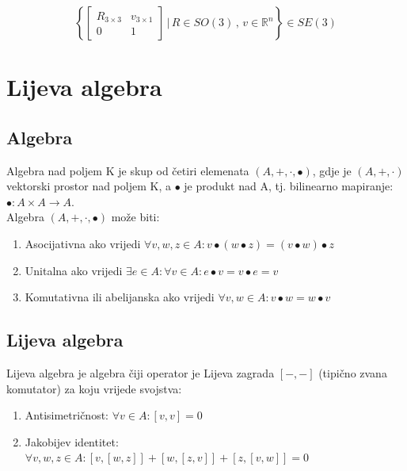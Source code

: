 \documentclass[times, utf8, diplomski]{fer}
\begin{document}
	\begin{equation}
		\left \{
		\begin{bmatrix}
		R_{3 \times 3} & v_{3 \times 1} \\
		0 & 1
		\end{bmatrix}
		\, \Biggr\rvert \, R \in SO(3) \, , \, v \in \mathbb{R}^n
		\right \} \in SE(3)
	\end{equation}	
	
\newpage
\clearpage

\section{Lijeva algebra}

	\subsection{Algebra} Algebra nad poljem K je skup od četiri elemenata $(A, +, \cdot, \bullet)$, gdje je $(A, +, \cdot)$ vektorski prostor nad poljem K, a $\bullet$ je produkt nad A, tj. bilinearno mapiranje: $\bullet : A \times A \rightarrow A$. \\
	Algebra $(A, +, \cdot, \bullet)$ može biti:
	\begin{enumerate}
		\item Asocijativna ako vrijedi $\forall v, w, z \in A : v \bullet (w \bullet z) = (v \bullet w) \bullet z$
		
		\item Unitalna ako vrijedi $\exists e \in A : \forall v \in A : e \bullet v = v \bullet e = v$
		
		\item Komutativna ili abelijanska ako vrijedi $\forall v, w \in A : v \bullet w = w \bullet v$
	\end{enumerate}
	
	\subsection{Lijeva algebra} Lijeva algebra je algebra čiji operator je Lijeva zagrada $[-,-]$ (tipično zvana komutator) za koju vrijede svojstva: 
	
	\begin{enumerate}
		
		\item Antisimetričnost: $\forall v \in A: [v, v] = 0$
		
		\item Jakobijev identitet: $\forall v, w, z \in A : [v,[w, z]] + [w,[z,v]] + [z,[v,w]] = 0$
		
	\end{enumerate} 
	
\end{document}
